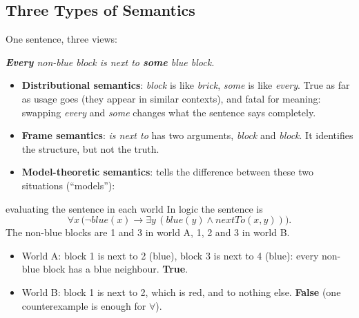 \subsection{Three Types of Semantics}
\label{sec:types-of-semantics}

One sentence, three views:
\begin{center}
\emph{\textbf{Every} non-blue block is next to \textbf{some} blue block.}
\end{center}

\begin{itemize}
  \item \textbf{Distributional semantics}: \emph{block} is like \emph{brick},
        \emph{some} is like \emph{every}. True as far as usage goes (they appear in
        similar contexts), and fatal for meaning: swapping \emph{every} and \emph{some}
        changes what the sentence says completely.
  \item \textbf{Frame semantics}: \emph{is next to} has two arguments, \emph{block} and
        \emph{block}. It identifies the structure, but not the truth.
  \item \textbf{Model-theoretic semantics}: tells the difference between these two
        situations (``models''):
\end{itemize}

\begin{center}
\end{center}

\begin{nbexample}{evaluating the sentence in each world}
In logic the sentence is
\[
  \forall x\, \bigl(\neg\mathit{blue}(x) \rightarrow \exists y\, (\mathit{blue}(y) \wedge
  \mathit{nextTo}(x, y))\bigr).
\]
The non-blue blocks are 1 and 3 in world A, 1, 2 and 3 in world B.
\begin{itemize}[nosep]
  \item World A: block 1 is next to 2 (blue), block 3 is next to 4 (blue): every
        non-blue block has a blue neighbour. \textbf{True}.
  \item World B: block 1 is next to 2, which is red, and to nothing else. \textbf{False}
        (one counterexample is enough for $\forall$).
\end{itemize}
\end{nbexample}

